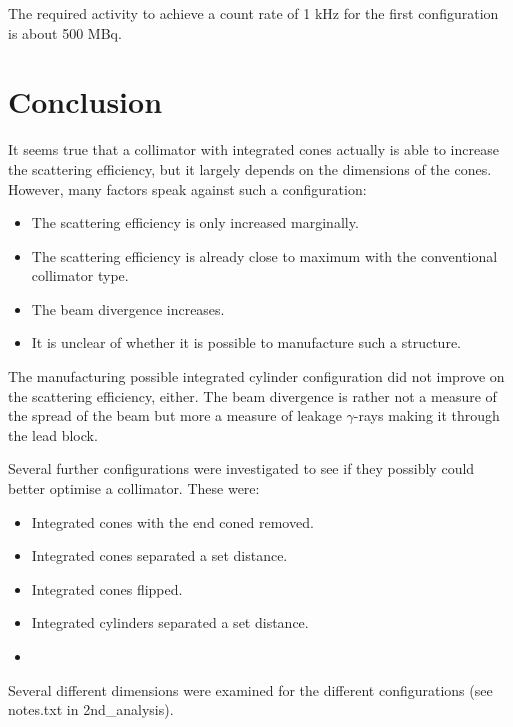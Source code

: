\documentclass[a4paper]{article}
\begin{document}
The required activity to achieve a count rate of 1 kHz for the first configuration is about 500 MBq.


\section{Conclusion}
It seems true that a collimator with integrated cones actually is able to increase the scattering efficiency, but it largely depends on the dimensions of the cones. However, many factors speak against such a configuration:
\begin{itemize}
  \item The scattering efficiency is only increased marginally.
  \item The scattering efficiency is already close to maximum with the conventional collimator type.
  \item The beam divergence increases.
  \item It is unclear of whether it is possible to manufacture such a structure.
\end{itemize}
The manufacturing possible integrated cylinder configuration did not improve on the scattering efficiency, either.
The beam divergence is rather not a measure of the spread of the beam but more a measure of leakage $\gamma$-rays making it through the lead block.

Several further configurations were investigated to see if they possibly could better optimise a collimator. These were:
\begin{itemize}
  \item Integrated cones with the end coned removed.
  \item Integrated cones separated a set distance.
  \item Integrated cones flipped.
  \item Integrated cylinders separated a set distance.
  \item
\end{itemize}
Several different dimensions were examined for the different configurations (see notes.txt in 2nd\_analysis).
\end{document}
